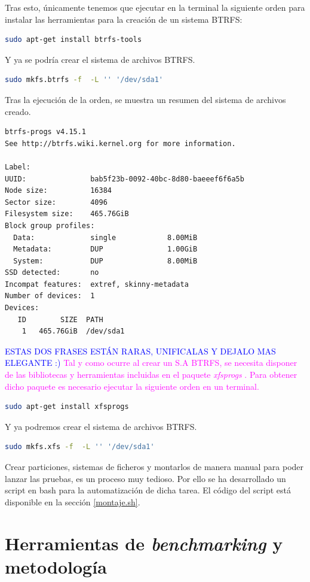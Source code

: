 Tras esto, únicamente tenemos que ejecutar en la terminal la siguiente orden para instalar las herramientas para la creación de un sistema BTRFS:
\begin{lstlisting}[language=bash]
sudo apt-get install btrfs-tools
\end{lstlisting}
Y ya se podría crear el sistema de archivos BTRFS.
\begin{lstlisting}[language=bash]
sudo mkfs.btrfs -f  -L '' '/dev/sda1'
\end{lstlisting}
Tras la ejecución de la orden, se muestra un resumen del sistema de archivos creado.
\begin{lstlisting}[language=bash]
btrfs-progs v4.15.1
See http://btrfs.wiki.kernel.org for more information.

Label:
UUID:               bab5f23b-0092-40bc-8d80-baeeef6f6a5b
Node size:          16384
Sector size:        4096
Filesystem size:    465.76GiB
Block group profiles:
  Data:             single            8.00MiB
  Metadata:         DUP               1.00GiB
  System:           DUP               8.00MiB
SSD detected:       no
Incompat features:  extref, skinny-metadata
Number of devices:  1
Devices:
   ID        SIZE  PATH
    1   465.76GiB  /dev/sda1

\end{lstlisting}

\textcolor{blue}{ESTAS DOS FRASES ESTÁN RARAS, UNIFICALAS Y DEJALO MAS ELEGANTE :)} \textcolor{magenta}{Tal y como ocurre al crear un S.A BTRFS, se necesita disponer de las bibliotecas y herramientas incluidas en el paquete \textit{xfsprogs} \cite{xfsprogs}. Para obtener dicho paquete es necesario ejecutar la siguiente orden en un terminal.}
\begin{lstlisting}[language=bash]
sudo apt-get install xfsprogs
\end{lstlisting}
Y ya podremos crear el sistema de archivos BTRFS.
\begin{lstlisting}[language=bash]
sudo mkfs.xfs -f  -L '' '/dev/sda1'
\end{lstlisting}

Crear particiones, sistemas de ficheros y montarlos de manera manual para poder lanzar las pruebas, es un proceso muy tedioso. Por ello se ha desarrollado un script en bash para la automatización de dicha tarea. El código del script está disponible en la sección \ref{montaje.sh}.

\section{Herramientas de \textit{benchmarking} y metodología}
